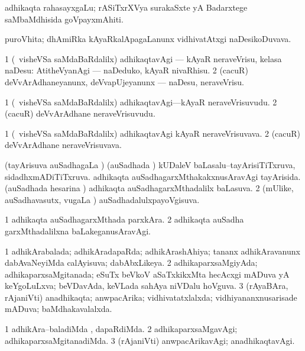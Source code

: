 \bentry
{}
\gl{\nA}
\bmng
adhikaqta rahasayxgaLu; rASiTxrXVya surakaSxte yA Badarxtege saMbaMdhisida goVpayxmAhiti. 
\emng
\eentry

\bentry
{}
\gl{\nA}
\bmng
puroVhita; dhAmiRka kAyaRkalApagaLanunx vidhivatAtxgi naDesikoDuvava. 
\emng
\eentry

\bentry
{}
\gl{\akirx}
\bmng
\bnum
\num{1} (\kanmu\ visheVSa saMdaBaRdalilx) adhikaqtavAgi --- kAyaR neraveVrisu, kelasa naDesu:  AtitheVyanAgi --- naDeduko, kAyaR nivaRhisu. 
\num{2} (cacuR) deVvArAdhaneyanunx, deVvapUjeyanunx --- naDesu, neraveVrisu. 
\enum
\emng
\eentry

\bentry
{}
\gl{\nA}
\bmng
\bnum
\num{1} (\kanmu\ visheVSa saMdaBaRdalilx) adhikaqtavAgi---kAyaR neraveVrisuvudu. 
\num{2} (cacuR) deVvArAdhane neraveVrisuvudu. 
\enum
\emng
\eentry

\bentry
{}
\gl{\nA}
\bmng
\bnum
\num{1} (\kanmu\ visheVSa saMdaBaRdalilx) adhikaqtavAgi kAyaR neraveVrisuvava. 
\num{2} (cacuR) deVvArAdhane neraveVrisuvava. 
\enum
\emng
\eentry

\bentry
{}
\gl{\gu}
\bmng
\bnum
{} (tayArisuva auSadhagaLa \vi) 
\banum
{} (auSadhada \vi) kUDaleV baLasalu--tayArisiTiTxruva, sidadhxmADiTiTxruva. 
 adhikaqta auSadhagarxMthakakxnusAravAgi tayArisida. 
 (auSadhada hesarina \vi) adhikaqta auSadhagarxMthadalilx baLasuva. 
\eanum
\numie
\num{2} (mUlike, auSadhavasutx, \mo vugaLa \vi) auSadhadalulxpayoVgisuva. 
\enum
\emng
\eentry

\bentry
{}
\gl{\kirxvi}
\bmng
\bnum
\num{1} adhikaqta auSadhagarxMthada parxkAra. 
\num{2} adhikaqta auSadha garxMthadalilxna baLakeganusAravAgi. 
\enum
\emng
\eentry

\bentry
{}
\gl{\gu}
\bmng
\bnum
\num{1} adhikArabalada; adhikAradapaRda; adhikArashAhiya; tananx adhikAravanunx dabAvaNeyiMda calAyisuva; dabAbxLikeya. 
\num{2} adhikaparxsaMgiyAda; adhikaparxsaMgitanada; eSuTx beVkoV aSaTxkikxMta hecAcxgi mADuva yA keYgoLuLxva; beVDavAda, keVLada sahAya niVDalu hoVguva. 
\num{3} (rAyaBAra, rAjaniVti) anadhikaqta; anwpacArika; vidhivatatxlalxda; vidhiyananxnusarisade mADuva; baMdhakavalalxda. 
\enum
\emng
\eentry

\bentry
{}
\gl{\kirxvi}
\bmng
\bnum
\num{1} adhikAra--baladiMda , dapaRdiMda. 
\num{2} adhikaparxsaMgavAgi; adhikaparxsaMgitanadiMda. 
\num{3} (rAjaniVti) anwpacArikavAgi; anadhikaqtavAgi. 
\enum
\emng
\eentry

